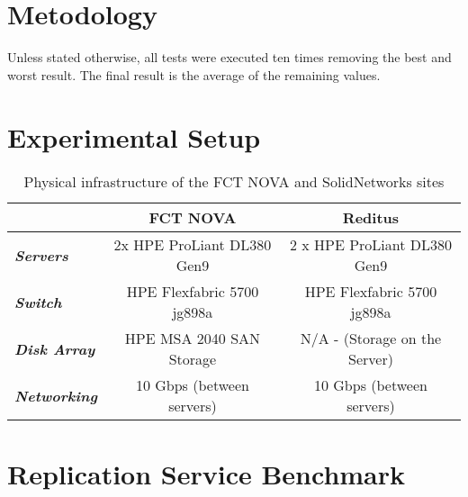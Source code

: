 \section{Metodology}
\label{sec:eval_method}

Unless stated otherwise, all tests were executed ten times removing the best and worst result. The final result is the average of the remaining values. 


\section{Experimental Setup}
\label{sec:eval_exp_setup}

\begin{table}[htpb]
\centering
\begin{tabular}{lcc}
                             & \textbf{FCT NOVA}          & \textbf{Reditus}              \\ \hline
\textit{\textbf{Servers}}    & 2x HPE ProLiant DL380 Gen9 & 2 x HPE ProLiant DL380 Gen9   \\
\textit{\textbf{Switch}}     & HPE Flexfabric 5700 jg898a & HPE Flexfabric 5700 jg898a    \\
\textit{\textbf{Disk Array}} & HPE MSA 2040 SAN Storage   & N/A - (Storage on the Server) \\
\textit{\textbf{Networking}} & 10 Gbps (between servers)  & 10 Gbps (between servers)     \\ \hline
\end{tabular}
\caption{Physical infrastructure of the FCT NOVA and SolidNetworks sites}
\end{table}




\section{Replication Service Benchmark}
\label{sec:eval_rep_bench}


